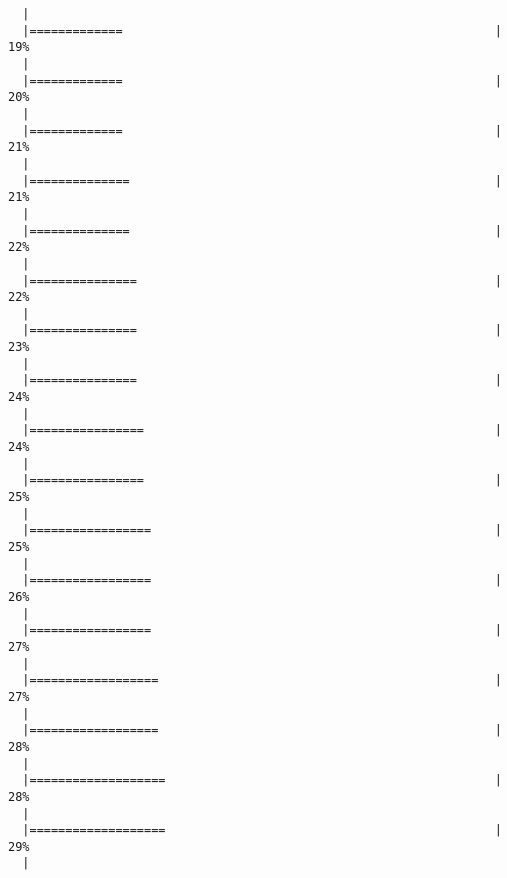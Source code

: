 \begin{knitrout}
\begin{kframe}
\begin{verbatim}
  |                                                                       
  |=============                                                    |  19%
  |                                                                       
  |=============                                                    |  20%
  |                                                                       
  |=============                                                    |  21%
  |                                                                       
  |==============                                                   |  21%
  |                                                                       
  |==============                                                   |  22%
  |                                                                       
  |===============                                                  |  22%
  |                                                                       
  |===============                                                  |  23%
  |                                                                       
  |===============                                                  |  24%
  |                                                                       
  |================                                                 |  24%
  |                                                                       
  |================                                                 |  25%
  |                                                                       
  |=================                                                |  25%
  |                                                                       
  |=================                                                |  26%
  |                                                                       
  |=================                                                |  27%
  |                                                                       
  |==================                                               |  27%
  |                                                                       
  |==================                                               |  28%
  |                                                                       
  |===================                                              |  28%
  |                                                                       
  |===================                                              |  29%
  |                                                                       

\end{verbatim}
\end{kframe}
\end{knitrout}
